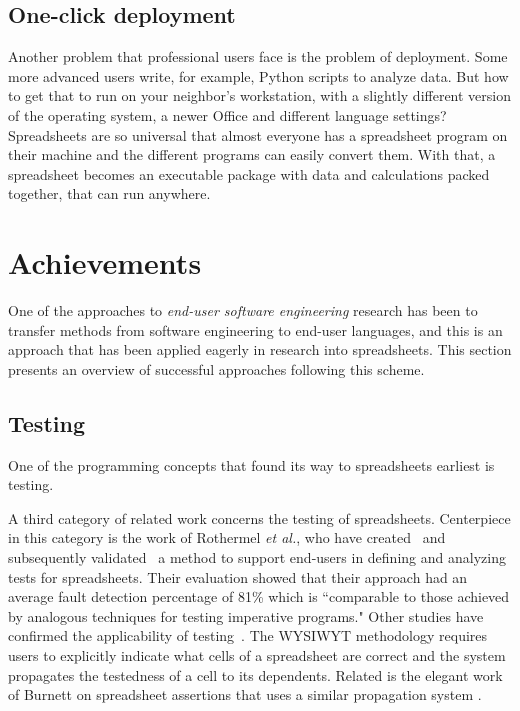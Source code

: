 \documentclass[conference]{IEEEtran}
\begin{document}
\subsection{One-click deployment}
Another problem that professional users face is the problem of deployment. Some more advanced users write, for example, Python scripts to analyze data. But how to get that to run on your neighbor's workstation, with a slightly different version of the operating system, a newer Office and different language settings? Spreadsheets are so universal that almost everyone has a spreadsheet program on their machine and the different programs can easily convert them. With that, a spreadsheet becomes an executable package with data and calculations packed together, that can run anywhere.

\section{Achievements} 
One of the approaches to \emph{end-user software engineering} research has been to transfer methods from software engineering to end-user languages, and this is an approach that has been applied eagerly in research into spreadsheets.  This section presents an overview of successful approaches following this scheme.

\subsection{Testing}
One of the programming concepts that found its way to spreadsheets earliest is testing. 




A third category of related work concerns the testing of spreadsheets. Centerpiece in this category is the work of Rothermel \emph{et al.}, who have created~\cite{Rothermel1997} and subsequently validated~\cite{Rothermel2000} a method to support end-users in defining and analyzing tests for spreadsheets. Their evaluation showed that their approach had an average fault detection percentage of 81\% which is ``comparable  to  those  achieved  by  analogous  techniques  for testing  imperative  programs." Other studies have confirmed the applicability of testing~\cite{Kruck2006}. The WYSIWYT methodology requires users to explicitly indicate what cells of a spreadsheet are correct and the system propagates the testedness of a cell to its dependents. Related is the elegant work of Burnett on spreadsheet assertions that uses a similar propagation system \cite{Burnett2003}.
\end{document}
